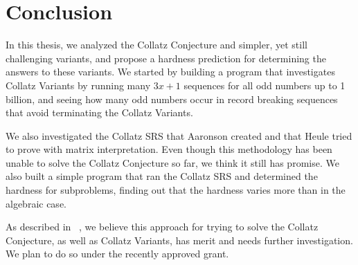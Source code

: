 \chapter{Conclusion} \label{sec:conclusion}
In this thesis, we analyzed the Collatz Conjecture and simpler, yet still challenging variants, and propose a hardness prediction for determining the answers to these variants. We started by building a program that investigates Collatz Variants by running many $3x+1$ sequences for all odd numbers up to 1 billion, and seeing how many odd numbers occur in record breaking sequences that avoid terminating the Collatz Variants. \par
We also investigated the Collatz SRS that Aaronson created and that Heule tried to prove with matrix interpretation. Even though this methodology has been unable to solve the Collatz Conjecture so far, we think it still has promise. We also built a simple program that ran the Collatz SRS and determined the hardness for subproblems, finding out that the hardness varies more than in the algebraic case.\par
As described in ~\cite{HeuleAaronson}, we believe this approach for trying to solve the Collatz Conjecture, as well as Collatz Variants, has merit and needs further investigation. We plan to do so under the recently approved grant.